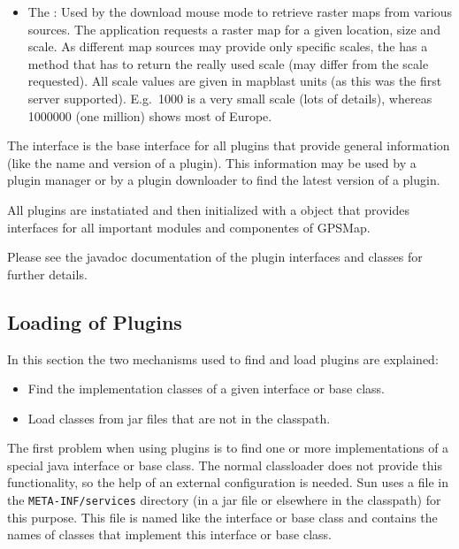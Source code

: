 \documentclass[a4paper]{article} %
\begin{document}
\begin{itemize}
\item The : Used by the download mouse
  mode to retrieve raster maps from various sources. The application
  requests a raster map for a given location, size and scale. As
  different map sources may provide only specific scales, the
   has a method that has to return
  the really used scale (may differ from the scale requested). All
  scale values are given in mapblast units (as this was the first
  server supported). E.g.\ 1000 is a very small scale (lots of
  details), whereas 1000000 (one million) shows most of Europe.

\end{itemize}

The interface  is the base interface for all
plugins that provide general information (like the name and version of
a plugin). This information may be used by a plugin manager or by a
plugin downloader to find the latest version of a plugin.

All plugins are instatiated and then initialized with a
 object that provides interfaces for all
important modules and componentes of GPSMap.

Please see the javadoc documentation of the plugin interfaces and
classes for further details.

\subsection{Loading of Plugins}
\label{SoftwareDesignOfTheGpstoolPackage-LoadingOfPlugins}

In this section the two mechanisms used to find and load plugins are
explained: 

\begin{itemize}

\item Find the implementation classes of a given interface or base
class. 

\item Load classes from jar files that are not in the classpath.

\end{itemize}

The first problem when using plugins is to find one or more
implementations of a special java interface or base class. The normal
classloader does not provide this functionality, so the help of an
external configuration is needed. Sun uses a file in the
\texttt{META-INF/services} directory (in a jar file or elsewhere in
the classpath) for this purpose. This file is named like the interface
or base class and contains the names of classes that implement this
interface or base class.
\end{document}

